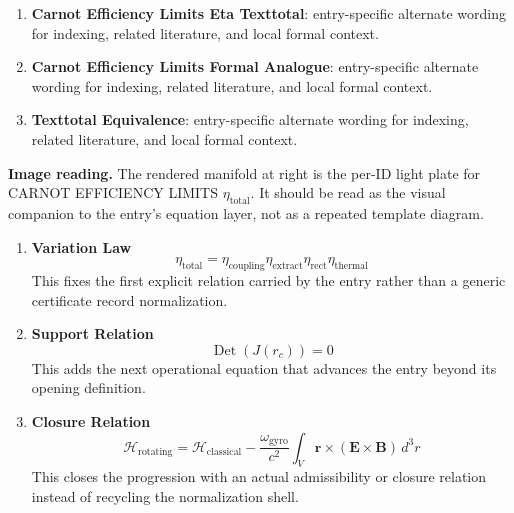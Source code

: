 \begin{enumerate}[leftmargin=1.6em,itemsep=6pt,topsep=4pt]
\item \textbf{Carnot Efficiency Limits Eta Texttotal}: entry-specific alternate wording for indexing, related literature, and local formal context.
\item \textbf{Carnot Efficiency Limits Formal Analogue}: entry-specific alternate wording for indexing, related literature, and local formal context.
\item \textbf{Texttotal Equivalence}: entry-specific alternate wording for indexing, related literature, and local formal context.
\end{enumerate}

\begin{samepage}
\noindent\begin{minipage}[t]{0.45\linewidth}
\vspace{0pt}
\raggedright
\scriptsize\textbf{Image reading.} The rendered manifold at right is the per-ID light plate for CARNOT EFFICIENCY LIMITS \(\eta_{\mathrm{total}}\). It should be read as the visual companion to the entry's equation layer, not as a repeated template diagram.\par
\end{minipage}\hfill
\begin{minipage}[t]{0.53\linewidth}
\vspace*{-0.10in}
\raggedright
{}
\end{minipage}
\end{samepage}

\clearpage


\begin{enumerate}[leftmargin=1.6em,itemsep=9pt,topsep=6pt]
\item \textbf{Variation Law}
\[
\eta_{\mathrm{total}}=
\eta_{\mathrm{coupling}}\eta_{\mathrm{extract}}\eta_{\mathrm{rect}}\eta_{\mathrm{thermal}}
\]
This fixes the first explicit relation carried by the entry rather than a generic certificate record normalization.

\item \textbf{Support Relation}
\[
\operatorname{Det}(J(r_c))=0
\]
This adds the next operational equation that advances the entry beyond its opening definition.

\item \textbf{Closure Relation}
\[
\mathcal{H}_{\mathrm{rotating}} =
\mathcal{H}_{\mathrm{classical}} -
\frac{\omega_{\mathrm{gyro}}}{c^2}
\int_V \mathbf{r}\times(\mathbf{E}\times\mathbf{B})\,d^3r
\]
This closes the progression with an actual admissibility or closure relation instead of recycling the normalization shell.
\end{enumerate}

